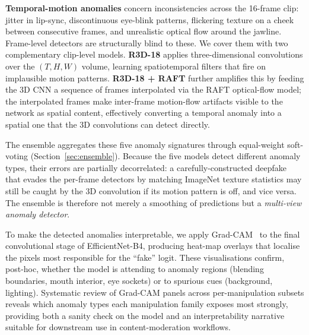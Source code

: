 \textbf{Temporal-motion anomalies} concern inconsistencies across the 16-frame clip: jitter in lip-sync, discontinuous eye-blink patterns, flickering texture on a cheek between consecutive frames, and unrealistic optical flow around the jawline. Frame-level detectors are structurally blind to these. We cover them with two complementary clip-level models. \textbf{R3D-18} applies three-dimensional convolutions over the $(T, H, W)$ volume, learning spatiotemporal filters that fire on implausible motion patterns. \textbf{R3D-18 + RAFT} further amplifies this by feeding the 3D CNN a sequence of frames interpolated via the RAFT optical-flow model; the interpolated frames make inter-frame motion-flow artifacts visible to the network as spatial content, effectively converting a temporal anomaly into a spatial one that the 3D convolutions can detect directly.

The ensemble aggregates these five anomaly signatures through equal-weight soft-voting (Section~\ref{sec:ensemble}). Because the five models detect different anomaly types, their errors are partially decorrelated: a carefully-constructed deepfake that evades the per-frame detectors by matching ImageNet texture statistics may still be caught by the 3D convolution if its motion pattern is off, and vice versa. The ensemble is therefore not merely a smoothing of predictions but a \textit{multi-view anomaly detector}.

To make the detected anomalies interpretable, we apply Grad-CAM~\cite{selvaraju2017gradcam} to the final convolutional stage of EfficientNet-B4, producing heat-map overlays that localise the pixels most responsible for the ``fake'' logit. These visualisations confirm, post-hoc, whether the model is attending to anomaly regions (blending boundaries, mouth interior, eye sockets) or to spurious cues (background, lighting). Systematic review of Grad-CAM panels across per-manipulation subsets reveals which anomaly types each manipulation family exposes most strongly, providing both a sanity check on the model and an interpretability narrative suitable for downstream use in content-moderation workflows.
